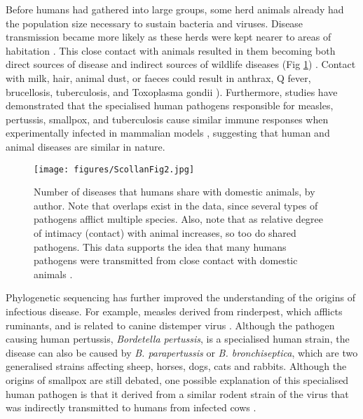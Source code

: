 Before humans had gathered into large groups, some herd animals already had the population size necessary to sustain bacteria and viruses. Disease transmission became more likely as these herds were kept nearer to areas of habitation \parencite[273]{Armelagos_1970}. 
This close contact with animals resulted in them becoming both direct sources of disease and indirect sources of wildlife diseases (Fig \ref{fig:ScollanFig2}) \parencites[370]{Pearce-Duvet_2006}[446]{Daszak_2000}. 
Contact with milk, hair, animal dust, or faeces could result in anthrax, Q fever, 
brucellosis, tuberculosis, and Toxoplasma gondii \parencites[273]{Armelagos_1970}[2750]{Sibley_2009}). 
Furthermore, studies have demonstrated that the specialised human pathogens responsible for measles, 
pertussis, smallpox, and tuberculosis cause similar immune responses when experimentally 
infected in mammalian models \parencites{Norrby_1985}{Arico_1987}, 
suggesting that human and animal diseases are similar in nature.

	\begin{figure}[!htb]
		\texttt{[image: figures/ScollanFig2.jpg]}
		\caption{Number of diseases that humans share with domestic animals, by author. Note that overlaps exist in the data, since several types of pathogens afflict multiple species. 
Also, note that as relative degree of intimacy (contact) with animal increases, so too do shared pathogens. This data supports the idea that many humans pathogens were transmitted from close contact with domestic animals \parencites{McNeill_1976}{Hull_1963}.}
		\label{fig:ScollanFig2} %
	\end{figure}
Phylogenetic sequencing has further improved the understanding of the origins of infectious disease. For example, measles derived from rinderpest, which afflicts ruminants, and is related to canine distemper virus 
\parencite{Westover_2001}. 
Although the pathogen causing human pertussis, \emph{Bordetella pertussis}, is a specialised human strain, the disease can also be caused by \emph{B. parapertussis} or \emph{B. bronchiseptica}, 
which are two generalised strains affecting sheep, horses, dogs, cats and rabbits\parencite[259]{Porter_1994}. 
Although the origins of smallpox are still debated, 
one possible explanation of this specialised human pathogen 
is that it derived from a similar rodent strain of the virus that was 
indirectly transmitted to humans from infected cows \parencites{Pulford_2002}[115--116]{Gubser_2004}. 

